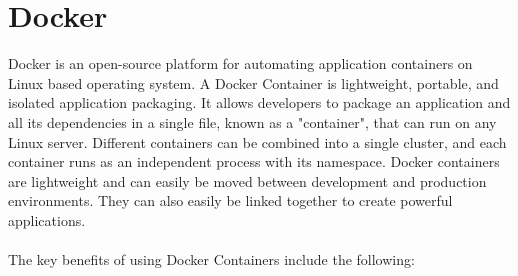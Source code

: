 \documentclass[BIF,Master,nenglish]{twbook}%
\begin{document}
\section{Docker}
Docker is an open-source platform for automating application containers on Linux based operating system. A Docker Container is lightweight, portable, and isolated application packaging. It allows developers to package an application and all its dependencies in a single file, known as a "container", that can run on any Linux server. Different containers can be combined into a single cluster, and each container runs as an independent process with its namespace. Docker containers are lightweight and can easily be moved between development and production environments. They can also easily be linked together to create powerful applications.\cite{rad2017}
\\
\\
The key benefits of using Docker Containers include the following: 
\end{document}
